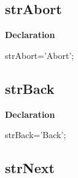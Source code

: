 \documentclass{report}
\newif\ifpdf
\begin{document}
\subsection*{strAbort}
\fi
\label{trstrings-strAbort}
\begin{list}{}{
\setlength{\itemindent}{0cm}
\setlength{\listparindent}{0cm}
\setlength{\leftmargin}{\evensidemargin}
\addtolength{\leftmargin}{\tmplength}
\settowidth{\labelsep}{X}
\addtolength{\leftmargin}{\labelsep}
\setlength{\labelwidth}{\tmplength}
}
\item[\textbf{Declaration}\hfill]
\ifpdf
\begin{flushleft}
\fi
\begin{ttfamily}
strAbort='Abort';\end{ttfamily}

\ifpdf
\end{flushleft}
\fi

\end{list}
\ifpdf
\subsection*{\large{\textbf{strBack}}\normalsize\hspace{1ex}\hrulefill}
\else
\subsection*{strBack}
\fi
\label{trstrings-strBack}
\begin{list}{}{
\setlength{\itemindent}{0cm}
\setlength{\listparindent}{0cm}
\setlength{\leftmargin}{\evensidemargin}
\addtolength{\leftmargin}{\tmplength}
\settowidth{\labelsep}{X}
\addtolength{\leftmargin}{\labelsep}
\setlength{\labelwidth}{\tmplength}
}
\item[\textbf{Declaration}\hfill]
\ifpdf
\begin{flushleft}
\fi
\begin{ttfamily}
strBack='Back';\end{ttfamily}

\ifpdf
\end{flushleft}
\fi

\end{list}
\ifpdf
\subsection*{\large{\textbf{strNext}}\normalsize\hspace{1ex}\hrulefill}
\else
\end{document}
